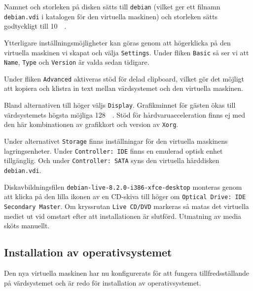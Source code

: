            {Namnet och storleken på disken sätts till \texttt{debian} (vilket
            ger ett filnamn \texttt{debian.vdi} i katalogen för den virtuella
            maskinen) och storleken sätts godtyckligt till \SI{10}{\mega\byte}.}
           {}

           {Ytterligare inställningsmöjligheter kan göras genom att högerklicka
            på den virtuella maskinen vi skapat och välja \texttt{Settings}.
            Under fliken \texttt{Basic} så ser vi att \texttt{Name}, \texttt{Type}
            och \texttt{Version} är valda sedan tidigare.}
           {}

           {Under fliken \texttt{Advanced} aktiveras stöd för delad clipboard,
            vilket gör det möjligt att kopiera och klistra in text mellan
            värdsystemet och den virtuella maskinen.}
           {}

           {Bland alternativen till höger väljs \texttt{Display}.
            Grafikminnet för gästen ökas till värdsystemets högsta möjliga
            \SI{128}{\mega\byte}. Stöd för hårdvaruacceleration finns ej med
            den här kombinationen av grafikkort och version av \texttt{Xorg}.}
           {}

           {Under alternativet \texttt{Storage} finns inställningar för den
            virtuella maskinens lagringsenheter. Under \texttt{Controller: IDE}
            finns en emulerad optisk enhet tillgänglig.
            Och under \texttt{Controller: SATA} syns den virtuella hårddisken
            \texttt{debian.vdi}.}
           {}

           {Diskavbildningsfilen \texttt{debian-live-8.2.0-i386-xfce-desktop} monteras
            genom att klicka på den lilla ikonen av en CD-skiva till höger om
            \texttt{Optical Drive: IDE Secondary Master}. Om kryssrutan
            \texttt{Live CD/DVD} markeras så matas det virtuella mediet ut vid omstart
            efter att installationen är slutförd. Utmatning av media sköts manuellt.}
           {}

           {}
           {}

           {}
           {}

\subsection{Installation av operativsystemet}
Den nya virtuella maskinen har nu konfigurerats för att fungera
tillfredsställande på värdsystemet och är redo för installation av
operativsystemet.

